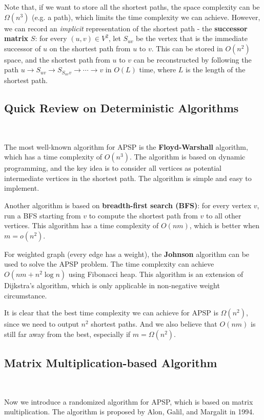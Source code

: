 \documentclass[12pt]{article}
\begin{document}
Note that, if we want to store all the shortest paths, the space complexity can be $\Omega(n^3)$ (e.g. a path), which limits the time complexity we can achieve. However, we can record an \emph{implicit} representation of the shortest path - the \textbf{successor matrix} $S$: for every $(u,v)\in V^2$, let $S_{uv}$ be the vertex that is the immediate successor of $u$ on the shortest path from $u$ to $v$. This can be stored in $O(n^2)$ space, and the shortest path from $u$ to $v$ can be reconstructed by following the path $u\to S_{uv}\to S_{S_{uv}v}\to\cdots\to v$ in $O(L)$ time, where $L$ is the length of the shortest path.

\subsection{Quick Review on Deterministic Algorithms}\

The most well-known algorithm for APSP is the \textbf{Floyd-Warshall} algorithm, which has a time complexity of $O(n^3)$. The algorithm is based on dynamic programming, and the key idea is to consider all vertices as potential intermediate vertices in the shortest path. The algorithm is simple and easy to implement.

Another algorithm is based on \textbf{breadth-first search (BFS)}: for every vertex $v$, run a BFS starting from $v$ to compute the shortest path from $v$ to all other vertices. This algorithm has a time complexity of $O(nm)$, which is better when $m=o(n^2)$.

For weighted graph (every edge has a weight), the \textbf{Johnson} algorithm can be used to solve the APSP problem. The time complexity can achieve $O(nm+n^2\log n)$ using Fibonacci heap. This algorithm is an extension of Dijkstra's algorithm, which is only applicable in non-negative weight circumstance. 

It is clear that the best time complexity we can achieve for APSP is $\Omega(n^2)$, since we need to output $n^2$ shortest paths. And we also believe that $O(nm)$ is still far away from the best, especially if $m=\Omega(n^2)$.

\subsection{Matrix Multiplication-based Algorithm}\

Now we introduce a randomized algorithm for APSP, which is based on matrix multiplication. The algorithm is proposed by Alon, Galil, and Margalit in 1994.
\end{document}
